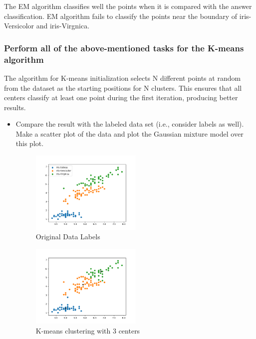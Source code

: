 \documentclass[a4paper]{article}
\begin{document}
\begin{itemize}
	The EM algorithm classifies well the points when it is compared with the answer classification. EM algorithm fails to classify the points near the boundary of iris-Versicolor and iris-Virgnica.
	\end{itemize}

	\subsubsection{Perform all of the above-mentioned tasks for the K-means algorithm}
	The algorithm for K-means initialization selects N different points at random from the dataset as the starting positions for N clusters.  This ensures that all centers classify at least one point during the first iteration, producing better results.
	\begin{itemize}
	\item Compare the result with the labeled data set (i.e., consider labels as well). Make a scatter plot of the data and plot the Gaussian mixture model over this plot.

	\begin{figure}[h]
		\begin{center}
			\includegraphics[width=0.5\textwidth]{answer.png}
			\caption{Original Data Labels}
		\end{center}
	\end{figure}

	\begin{figure}[h]
		\begin{center}
			\includegraphics[width=0.5\textwidth]{kmeans_cluster.png}
			\caption{K-means clustering with 3 centers}
		\end{center}
	\end{figure}


\end{itemize}
\end{document}
